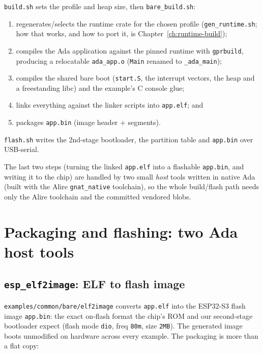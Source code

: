 \texttt{build.sh} sets the profile and heap size, then \texttt{bare\_build.sh}:

\begin{enumerate}
\item regenerates/selects the runtime crate for the chosen profile
  (\texttt{gen\_runtime.sh}; how that works, and how to port it, is
  Chapter~\ref{ch:runtime-build});
\item compiles the Ada application against the pinned runtime with
  \texttt{gprbuild}, producing a relocatable \texttt{ada\_app.o}
  (\texttt{Main} renamed to \texttt{\_ada\_main});
\item compiles the shared bare boot (\texttt{start.S}, the interrupt vectors,
  the heap and a freestanding libc) and the example's C console glue;
\item links everything against the linker scripts into \texttt{app.elf}; and
\item packages \texttt{app.bin} (image header + segments).
\end{enumerate}

\texttt{flash.sh} writes the 2nd-stage bootloader, the partition table and
\texttt{app.bin} over USB-serial.

The last two steps (turning the linked \texttt{app.elf} into a flashable
\texttt{app.bin}, and writing it to the chip) are handled by two small
\emph{host} tools written in native Ada (built with the Alire
\texttt{gnat\_native} toolchain), so the whole build/flash path needs only the
Alire toolchain and the committed vendored blobs.

\section{Packaging and flashing: two Ada host tools}

\subsection{\texttt{esp\_elf2image}: ELF to flash image}

\texttt{examples/common/bare/elf2image} converts \texttt{app.elf} into the
ESP32-S3 flash image \texttt{app.bin}: the exact on-flash format the chip's
ROM and our second-stage bootloader expect (flash mode \texttt{dio}, freq
\texttt{80m}, size \texttt{2MB}). The generated image boots unmodified on
hardware across every example. The packaging is more than a flat copy:

